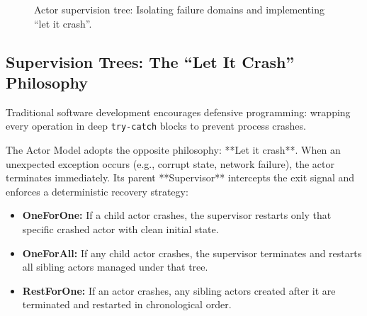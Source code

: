\begin{figure}[htbp]
\centering
{}
\caption{Actor supervision tree: Isolating failure domains and implementing ``let it crash''.}
\label{fig:actor-tree}
\end{figure}

\subsection{Supervision Trees: The ``Let It Crash'' Philosophy}

Traditional software development encourages defensive programming: wrapping every operation in deep \texttt{try-catch} blocks to prevent process crashes.

The Actor Model adopts the opposite philosophy: **Let it crash**. 
When an unexpected exception occurs (e.g., corrupt state, network failure), the actor terminates immediately. Its parent **Supervisor** intercepts the exit signal and enforces a deterministic recovery strategy:
\begin{itemize}[leftmargin=15pt]
  \item \textbf{OneForOne:} If a child actor crashes, the supervisor restarts only that specific crashed actor with clean initial state.
  \item \textbf{OneForAll:} If any child actor crashes, the supervisor terminates and restarts all sibling actors managed under that tree.
  \item \textbf{RestForOne:} If an actor crashes, any sibling actors created after it are terminated and restarted in chronological order.
\end{itemize}

